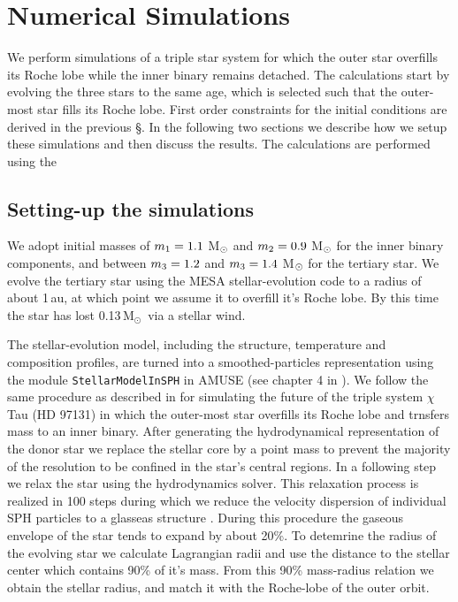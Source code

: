 \documentclass{aastex62}
\newcommand{\MSun}{\mbox{M$_\odot$}}
\begin{document}
\section{Numerical Simulations} \label{sims}

We perform simulations of a triple star system for which the outer
star overfills its Roche lobe while the inner binary remains
detached. The calculations start by evolving the three stars to the
same age, which is selected such that the outer-most star fills its
Roche lobe.  First order constraints for the initial conditions are
derived in the previous \S. In the following two sections we describe
how we setup these simulations and then discuss the results. The
calculations are performed using the

\subsection{Setting-up the simulations}

We adopt initial masses of $m_{\rm 1} = 1.1$ M$_{\rm \odot}$ and
$m_{\rm 2} = 0.9$ M$_{\rm \odot}$ for the inner binary components, and
between $m_{\rm 3} = 1.2$ and $m_{\rm 3} = 1.4$ M$_{\rm \odot}$ for
the tertiary star.  We evolve the tertiary star using the MESA
stellar-evolution code \cite{2011ApJS..192....3P} to a radius of about
1\,au, at which point we assume it to overfill it's Roche lobe.  By
this time the star has lost 0.13\,\MSun\, via a stellar wind.

The stellar-evolution model, including the structure, temperature and
composition profiles, are turned into a smoothed-particles
representation using the module {\tt StellarModelInSPH} in AMUSE (see
chapter 4 in \cite{AMUSE}).  We follow the same procedure as described
in \cite{2014MNRAS.438.1909D} for simulating the future of the triple
system $\chi$ Tau (HD 97131) in which the outer-most star overfills its
Roche lobe and trnsfers mass to an inner binary.  After generating the hydrodynamical
representation of the donor star we replace the stellar core by a
point mass to prevent the majority of the resolution to be confined in
the star's central regions.  In a following step we relax the star
using the hydrodynamics solver. This relaxation process is realized in
100 steps during which we reduce the velocity dispersion of individual
SPH particles to a glasseas structure \citep[see, for example, \S\,3.3
  on page 40 in][]{1994astro.ph.10043W}. During this procedure the
gaseous envelope of the star tends to expand by about 20\%.  To
detemrine the radius of the evolving star we calculate Lagrangian
radii and use the distance to the stellar center which contains 90\%
of it's mass. From this 90\% mass-radius relation we obtain the stellar radius,
and match it with the Roche-lobe of the outer orbit.
\end{document}
